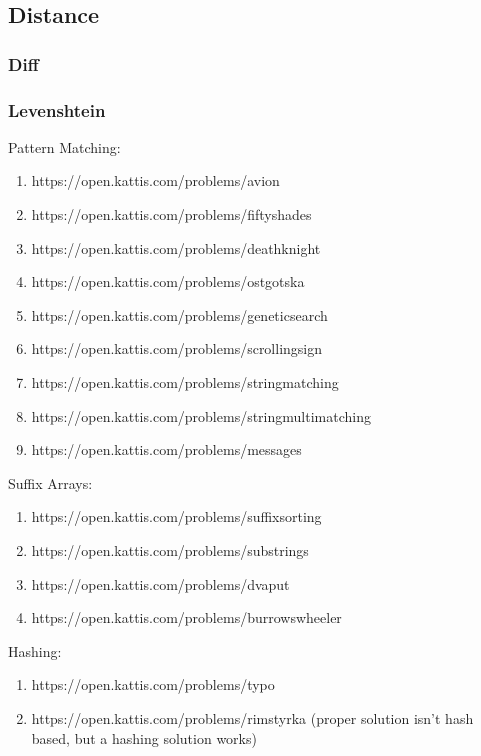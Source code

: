 \subsection{Distance}
\subsubsection{Diff}
\subsubsection{Levenshtein}

\hrulefill

Pattern Matching:
\begin{enumerate}
\item https://open.kattis.com/problems/avion
\item https://open.kattis.com/problems/fiftyshades
\item https://open.kattis.com/problems/deathknight
\item https://open.kattis.com/problems/ostgotska
\item https://open.kattis.com/problems/geneticsearch
\item https://open.kattis.com/problems/scrollingsign
\item https://open.kattis.com/problems/stringmatching
\item https://open.kattis.com/problems/stringmultimatching
\item https://open.kattis.com/problems/messages
\end{enumerate}

Suffix Arrays:
\begin{enumerate}
\item https://open.kattis.com/problems/suffixsorting
\item https://open.kattis.com/problems/substrings
\item https://open.kattis.com/problems/dvaput
\item https://open.kattis.com/problems/burrowswheeler
\end{enumerate}

Hashing:
\begin{enumerate}
\item https://open.kattis.com/problems/typo
\item https://open.kattis.com/problems/rimstyrka (proper solution isn't hash based, but a hashing solution works)
\end{enumerate}

